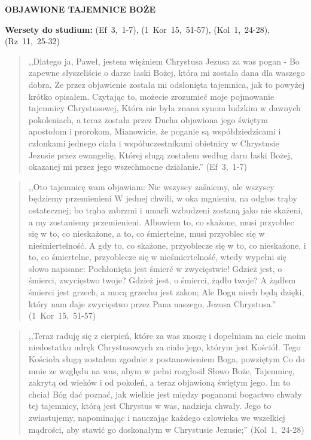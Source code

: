 \documentclass[10pt,a4paper,oneside]{article}
\begin{document}
\centerline{\textbf{\MakeUppercase{Objawione tajemnice Boże}}}
\begin{center}
\textbf{Wersety do studium:} \mbox{(Ef 3, 1-7)}, \mbox{(1 Kor 15, 51-57)}, \mbox{(Kol 1, 24-28)}, \mbox{(Rz 11, 25-32)}
\end{center}
\begin{quote}
,,Dlatego ja, Paweł, jestem więźniem Chrystusa Jezusa za was pogan - Bo zapewne słyszeliście o darze łaski Bożej, która mi została dana dla waszego dobra, Że przez objawienie została mi odsłonięta tajemnica, jak to powyżej krótko opisałem. Czytając to, możecie zrozumieć moje pojmowanie tajemnicy Chrystusowej, Która nie była znana synom ludzkim w dawnych pokoleniach, a teraz została przez Ducha objawiona jego świętym apostołom i prorokom, Mianowicie, że poganie są współdziedzicami i członkami jednego ciała i współuczestnikami obietnicy w Chrystusie Jezusie przez ewangelię, Której sługą zostałem według daru łaski Bożej, okazanej mi przez jego wszechmocne działanie.'' \mbox{(Ef 3, 1-7)}
\end{quote}
\begin{quote}
,,Oto tajemnicę wam objawiam: Nie wszyscy zaśniemy, ale wszyscy będziemy przemienieni W jednej chwili, w oka mgnieniu, na odgłos trąby ostatecznej; bo trąba zabrzmi i umarli wzbudzeni zostaną jako nie skażeni, a my zostaniemy przemienieni. Albowiem to, co skażone, musi przyoblec się w to, co nieskażone, a to, co śmiertelne, musi przyoblec się w nieśmiertelność. A gdy to, co skażone, przyoblecze się w to, co nieskażone, i to, co śmiertelne, przyoblecze się w nieśmiertelność, wtedy wypełni się słowo napisane: Pochłonięta jest śmierć w zwycięstwie! Gdzież jest, o śmierci, zwycięstwo twoje? Gdzież jest, o śmierci, żądło twoje? A żądłem śmierci jest grzech, a mocą grzechu jest zakon; Ale Bogu niech będą dzięki, który nam daje zwycięstwo przez Pana naszego, Jezusa Chrystusa.'' \mbox{(1 Kor 15, 51-57)}
\end{quote}
\begin{quote}
,,Teraz raduję się z cierpień, które za was znoszę i dopełniam na ciele moim niedostatku udręk Chrystusowych za ciało jego, którym jest Kościół. Tego Kościoła sługą zostałem zgodnie z postanowieniem Boga, powziętym Co do mnie ze względu na was, abym w pełni rozgłosił Słowo Boże, Tajemnicę, zakrytą od wieków i od pokoleń, a teraz objawioną świętym jego. Im to chciał Bóg dać poznać, jak wielkie jest między poganami bogactwo chwały tej tajemnicy, którą jest Chrystus w was, nadzieja chwały. Jego to zwiastujemy, napominając i nauczając każdego człowieka we wszelkiej mądrości, aby stawić go doskonałym w Chrystusie Jezusie;'' \mbox{(Kol 1, 24-28)}
\end{quote}
\end{document}
